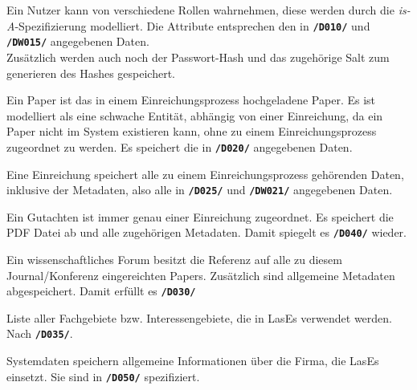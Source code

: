 \begin{description}
	 Ein Nutzer kann von verschiedene Rollen wahrnehmen, diese werden durch die \emph{is-A}-Spezifizierung modelliert. Die Attribute entsprechen den in \texttt{\textbf{/D010/}} und \texttt{\textbf{/DW015/}} angegebenen Daten.\\Zusätzlich werden auch noch der Passwort-Hash und das zugehörige Salt zum generieren des Hashes gespeichert.

	 Ein Paper ist das in einem Einreichungsprozess hochgeladene Paper. Es ist modelliert als eine schwache Entität, abhängig von einer Einreichung, da ein Paper nicht im System existieren kann, ohne zu einem Einreichungsprozess zugeordnet zu werden. Es speichert die in \texttt{\textbf{/D020/}} angegebenen Daten.

	 Eine Einreichung speichert alle zu einem Einreichungsprozess gehörenden Daten, inklusive der Metadaten, also alle in \texttt{\textbf{/D025/}} und \texttt{\textbf{/DW021/}} angegebenen Daten.

	 Ein Gutachten ist immer genau einer Einreichung zugeordnet. Es speichert die PDF Datei ab und alle zugehörigen Metadaten.
	Damit spiegelt es \texttt{\textbf{/D040/}} wieder.

	 Ein wissenschaftliches Forum besitzt die Referenz auf alle zu diesem Journal/Konferenz eingereichten Papers. Zusätzlich sind allgemeine Metadaten abgespeichert. Damit erfüllt es \texttt{\textbf{/D030/}}

	 Liste aller Fachgebiete bzw. Interessengebiete, die in LasEs verwendet werden. Nach \texttt{\textbf{/D035/}}.

	 Systemdaten speichern allgemeine Informationen über die Firma, die LasEs einsetzt. Sie sind in \texttt{\textbf{/D050/}} spezifiziert.

\end{description}
